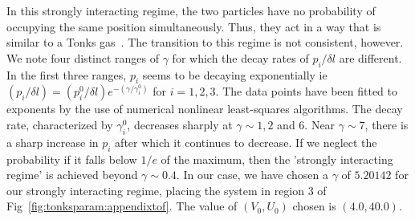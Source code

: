 In this strongly interacting regime, the two particles have no probability of occupying the same position simultaneously. Thus, they act in a way that is similar to a Tonks gas~\cite{tonks:gas}.  The transition to this regime is not consistent, however. We note four distinct ranges of $\gamma$ for which the decay rates of 
$p_i/{\delta l}$  are different. In the first three ranges, $p_i$ seems to be decaying exponentially ie $\left( p_i/{\delta l}\right)=\left( p^0_i/{\delta l} \right) e^{-(\gamma/\gamma^0_i)}$ for $i=1,2,3$. The data points have been fitted to exponents by the use of numerical nonlinear least-squares algorithms.
The decay rate, characterized by $ \gamma^0_i $, decreases sharply at $\gamma\sim 1, 2$ and $6$. Near $\gamma\sim 7$, there is a sharp increase in $p_i$ after which it continues to decrease. If we neglect the probability if it falls below $1/e$ of the maximum, then the 'strongly interacting regime' is achieved beyond $\gamma\sim 0.4$. In our case, we have chosen a $\gamma$ of $5.20142$ for our strongly interacting regime, placing the system in region $3$ of Fig~\ref{fig:tonksparam:appendixtof}. The value of $\left(V_0,U_0\right)$ chosen is $\left(4.0, 40.0\right)$.

